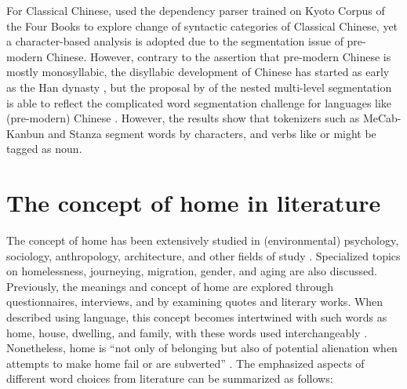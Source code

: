 For Classical Chinese, \textcite{li2020evolution} used the dependency parser trained on Kyoto Corpus of the Four Books to explore change of syntactic categories of Classical Chinese, yet a character-based analysis is adopted due to the segmentation issue of pre-modern Chinese. However, contrary to the assertion that pre-modern Chinese is mostly monosyllabic, the disyllabic development of Chinese has started as early as the Han dynasty \parencite{zhou2009,chang2008}, but the proposal by \textcite{lee2012classical} of the nested multi-level segmentation is able to reflect the complicated word segmentation challenge for languages like (pre-modern) Chinese . However, the results show that tokenizers such as MeCab-Kanbun and Stanza segment words by characters, and verbs like  or  might be tagged as noun.



\section{The concept of home in literature}
The concept of home has been extensively studied in (environmental) psychology, sociology, anthropology, architecture, and other fields of study \parencite{samanani2019house,mallett2004understanding,moore2000placing,sixsmith1986meaning}. Specialized topics on homelessness, journeying, migration, gender, and aging are also discussed. Previously, the meanings and concept of home are explored through questionnaires, interviews, and by examining quotes and literary works. When described using language, this concept becomes intertwined with such words as home, house, dwelling, and family, with these words used interchangeably \parencite{mallett2004understanding,sixsmith1986meaning}. Nonetheless, home is ``not only of belonging but also of potential alienation when attempts to make home fail or are subverted'' \parencite{samanani2019house}. The emphasized aspects of different word choices from literature can be summarized as follows: 

